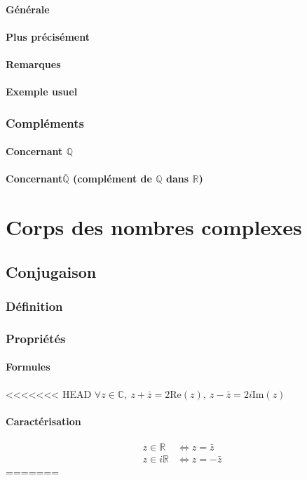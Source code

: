 \documentclass[12pt,a4paper,french]{book}
\begin{document}
			\subsubsection{Générale}
			\subsubsection{Plus précisément}
			\subsubsection{Remarques}
			\subsubsection{Exemple usuel}
		\subsection{Compléments}
			\subsubsection{Concernant $\mathbb{Q}$}
			\subsubsection{Concernant$\bar{\mathbb{Q}}$ (complément de $\mathbb{Q}$ dans $\mathbb{R}$)}
			
			
\chapter{Corps des nombres complexes}
	\section{Conjugaison}
		\subsection{Définition}
		\subsection{Propriétés}
			\subsubsection{Formules}
<<<<<<< HEAD
			$\forall z \in \mathbb{C}, \ z+ \bar{z} = 2\mbox{Re}(z), \ z - \bar{z} = 2i\mbox{Im}(z)$
		
			\subsubsection{Caractérisation}
				\begin{equation} \begin{split}
						z \in \mathbb{R} &\Leftrightarrow z = \bar{z} \\
						z \in i\mathbb{R} &\Leftrightarrow z = -\bar{z}
					\end{split}
				\end{equation} 
=======
\end{document}
